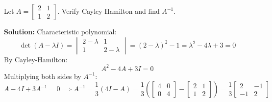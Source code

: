 \begin{example}
Let $A = \begin{bmatrix} 2 & 1 \\ 1 & 2 \end{bmatrix}$. Verify Cayley-Hamilton and find $A^{-1}$.

\textbf{Solution:}
Characteristic polynomial:
\begin{equation*}
\det(A - \lambda I) = \begin{vmatrix} 2-\lambda & 1 \\ 1 & 2-\lambda \end{vmatrix} = (2-\lambda)^2 - 1 = \lambda^2 - 4\lambda + 3 = 0
\end{equation*}
By Cayley-Hamilton:
\begin{equation*}
A^2 - 4A + 3I = 0
\end{equation*}
Multiplying both sides by $A^{-1}$:
\begin{equation*}
A - 4I + 3A^{-1} = 0 \implies A^{-1} = \frac{1}{3}(4I - A) = \frac{1}{3}\left( \begin{bmatrix} 4 & 0 \\ 0 & 4 \end{bmatrix} - \begin{bmatrix} 2 & 1 \\ 1 & 2 \end{bmatrix} \right) = \frac{1}{3}\begin{bmatrix} 2 & -1 \\ -1 & 2 \end{bmatrix}
\end{equation*}
\end{example}
